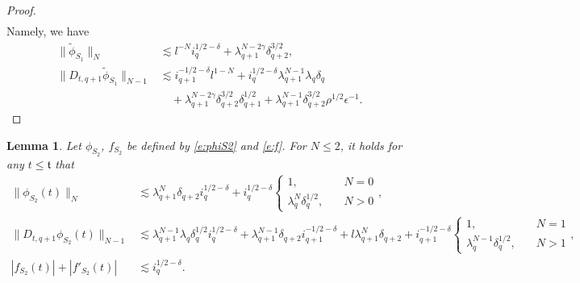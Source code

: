 \documentclass[10pt,a4paper]{amsart}
\numberwithin{equation}{section}
\numberwithin{corollario}{section}
\newtheorem{lemma}{Lemma}
\numberwithin{lemma}{section}
\numberwithin{prop}{section}
\theoremstyle{definition}
\theoremstyle{remark}
\newcommand{\qq}{_{q+1}}
\newcommand{\qqq}{_{q+2}}
\begin{document}
\begin{proof}
\begin{align}
\end{align}
Namely, we have 
\begin{align}\label{est:phiS1third}
    \|\tilde{\phi}_{S_1}\|_N
    &\lesssim l^{-N}i_q^{1/2-\delta}+\lambda\qq^{N-2\gamma}\delta\qqq^{3/2},\\
    \label{est:DphiS1third}
    \|D_{t,q+1} \tilde{\phi}_{S_1}\|_{N-1}
    &\lesssim i\qq^{-1/2-\delta}l^{1-N}+i_q^{1/2-\delta}\lambda\qq^{N-1}\lambda_q\delta_q\\
    &\quad+\lambda\qq^{N-2\gamma}\delta\qqq^{3/2}\delta\qq^{1/2}+\lambda\qq^{N-1}\delta\qqq^{3/2}\rho^{1/2}\epsilon^{-1}.
\end{align}

\end{proof}
\begin{lemma}\label{lemma:phiS2}
Let $\phi_{S_2}$, $f_{S_2}$ be defined by \eqref{e:phiS2} and \eqref{e:f}. For $N\le 2$, it holds for any $t\le \mathfrak{t}$ that
    \begin{align}
    \label{est:phiS2}\|\phi_{S_2}(t)\|_N
    &\lesssim \lambda\qq^N\delta\qqq i_q^{1/2-\delta}+i_q^{1/2-\delta}\begin{cases}
        1,\quad &N=0\\
        \lambda_q^N\delta_q^{1/2},\quad &N>0
    \end{cases},
    \\
    \label{e:DtphiS2}\|D_{t,q+1}\phi_{S_2}(t)\|_{N-1}
    &\lesssim 
    \lambda\qq^{N-1}\lambda_q\delta_q^{1/2}i_q^{1/2-\delta}+\lambda\qq^{N-1}\delta\qqq i\qq^{-1/2-\delta}+l\lambda\qq^{N}\delta\qqq+i\qq^{-1/2-\delta}\begin{cases}
        1,\quad &N=1\\
        \lambda_q^{N-1}\delta_q^{1/2},\quad &N>1
    \end{cases},\\
    |f_{S_2}(t)|+|f'_{S_2}(t)|
    &\lesssim i_q^{1/2-\delta}.
    \end{align}   
\end{lemma}
\end{document}
